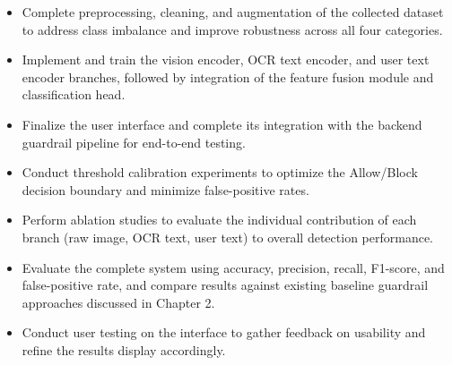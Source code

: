 \begin{itemize}

    \item Complete preprocessing, cleaning, and augmentation of the collected
    dataset to address class imbalance and improve robustness across all
    four categories.

    \item Implement and train the vision encoder, OCR text encoder, and user
    text encoder branches, followed by integration of the feature fusion
    module and classification head.

    \item Finalize the user interface and complete its integration with the
    backend guardrail pipeline for end-to-end testing.

    \item Conduct threshold calibration experiments to optimize the
    Allow/Block decision boundary and minimize false-positive rates.

    \item Perform ablation studies to evaluate the individual contribution
    of each branch (raw image, OCR text, user text) to overall detection
    performance.

    \item Evaluate the complete system using accuracy, precision, recall,
    F1-score, and false-positive rate, and compare results against existing
    baseline guardrail approaches discussed in Chapter 2.

    \item Conduct user testing on the interface to gather feedback on
    usability and refine the results display accordingly.

\end{itemize}